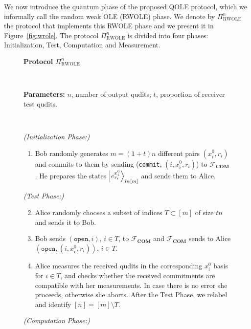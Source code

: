 We now introduce the quantum phase of the proposed QOLE protocol, which we informally call the random weak OLE (RWOLE) phase. We denote by $\Pi^n_{\text{RWOLE}}$ the protocol that implements this RWOLE phase and we present it in Figure~\ref{fig:wrole}. The protocol $\Pi^n_{\text{RWOLE}}$ is divided into four phases: Initialization, Test, Computation and Measurement. 


\begin{figure}[h!]
    \centering
        \begin{tcolorbox}
            
            \centerline{\textbf{Protocol $\Pi^n_{\text{RWOLE}}$}}
            
            \
            
\textbf{Parameters:} $n$, number of output  qudits; $t$, proportion of receiver test  qudits.

    \
    
    \textit{(Initialization Phase:)}
    \begin{enumerate}
   
        \item Bob randomly generates $m = (1+t)n$ different pairs $(x^0_i, r_i)$ and commits to them by sending (\texttt{commit}, $(i, x^0_i, r_i)$) to $\mathcal{F}_{\textbf{COM}}$. He prepares the states $\ket{e^{x^0_i}_{r_i}}_{i\in [m]}$ and sends them to Alice.
        
        
    \end{enumerate}
    \textit{(Test Phase:)}
    \begin{enumerate}
    \setcounter{enumi}{1}    
        
        \item Alice randomly chooses a subset of indices $T\subset [m]$ of size $t n$ and sends it to Bob.
        
        \item Bob sends $(\texttt{open}, i)$, $i\in T$, to $\mathcal{F}_{\textbf{COM}}$ and $\mathcal{F}_{\textbf{COM}}$ sends to Alice $(\texttt{open}, (i, x^0_i, r_i))$, $i\in T$.
        
        \item Alice measures the received  qudits in the corresponding $x^0_i$ basis for $i\in T$, and checks whether the received commitments are compatible with her measurements. In case there is no error she proceeds, otherwise she aborts.
         After the Test Phase,  we relabel and identify $[n]=[m]\setminus T$.
    \end{enumerate}
    \textit{(Computation Phase:)}
    \begin{enumerate}
    \setcounter{enumi}{5}       
    

\end{enumerate}
\end{tcolorbox}
\end{figure}
